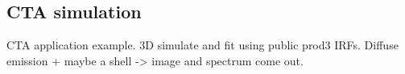 \subsection{CTA simulation}
\label{sec:apps:cta}

CTA application example.
3D simulate and fit using public prod3 IRFs.
Diffuse emission + maybe a shell -> image and spectrum come out.
